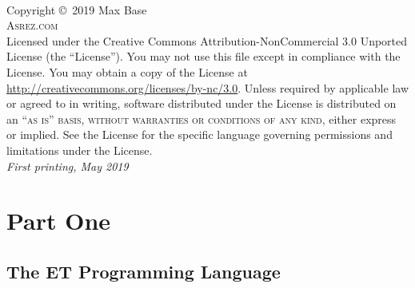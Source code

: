 \documentclass[11pt,fleqn]{book}
\begin{document}
\begingroup
\thispagestyle{empty}
\vfill
\endgroup

\newpage
~\vfill
\thispagestyle{empty}

\noindent Copyright \copyright\ 2019 Max Base\\

\noindent \textsc{Asrez.com}\\

\noindent Licensed under the Creative Commons Attribution-NonCommercial 3.0 Unported License (the ``License''). You may not use this file except in compliance with the License. You may obtain a copy of the License at \url{http://creativecommons.org/licenses/by-nc/3.0}. Unless required by applicable law or agreed to in writing, software distributed under the License is distributed on an \textsc{``as is'' basis, without warranties or conditions of any kind}, either express or implied. See the License for the specific language governing permissions and limitations under the License.\\
\noindent \textit{First printing, May 2019}

\pagestyle{empty}
\tableofcontents
\cleardoublepage
\pagestyle{fancy}

\part{Part One}


\chapter{The ET Programming Language}
\end{document}
